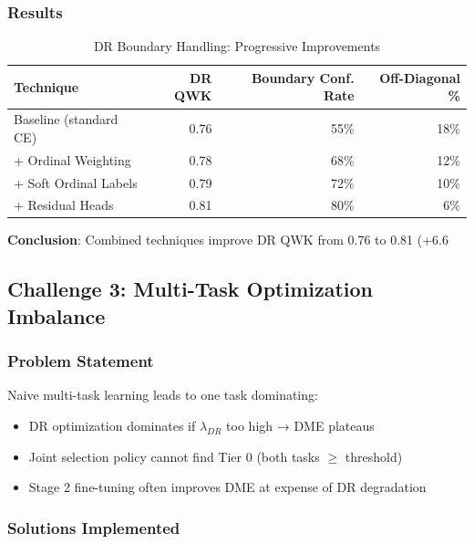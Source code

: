 \documentclass[12pt,a4paper]{article}
\begin{document}
\subsubsection{Results}

\begin{table}[H]
\centering
\small
\caption{DR Boundary Handling: Progressive Improvements}
\begin{tabular}{|l|r|r|r|}
\hline
\textbf{Technique} & \textbf{DR QWK} & \textbf{Boundary Conf. Rate} & \textbf{Off-Diagonal \%} \\
\hline
Baseline (standard CE) & 0.76 & 55\% & 18\% \\
+ Ordinal Weighting & 0.78 & 68\% & 12\% \\
+ Soft Ordinal Labels & 0.79 & 72\% & 10\% \\
+ Residual Heads & 0.81 & 80\% & 6\% \\
\hline
\end{tabular}
\end{table}

\textbf{Conclusion}: Combined techniques improve DR QWK from 0.76 to 0.81 (+6.6%

\subsection{Challenge 3: Multi-Task Optimization Imbalance}

\subsubsection{Problem Statement}

Naive multi-task learning leads to one task dominating:

\begin{itemize}
    \item DR optimization dominates if $\lambda_{DR}$ too high → DME plateaus
    \item Joint selection policy cannot find Tier 0 (both tasks $\geq$ threshold)
    \item Stage 2 fine-tuning often improves DME at expense of DR degradation
\end{itemize}

\subsubsection{Solutions Implemented}
\end{document}
